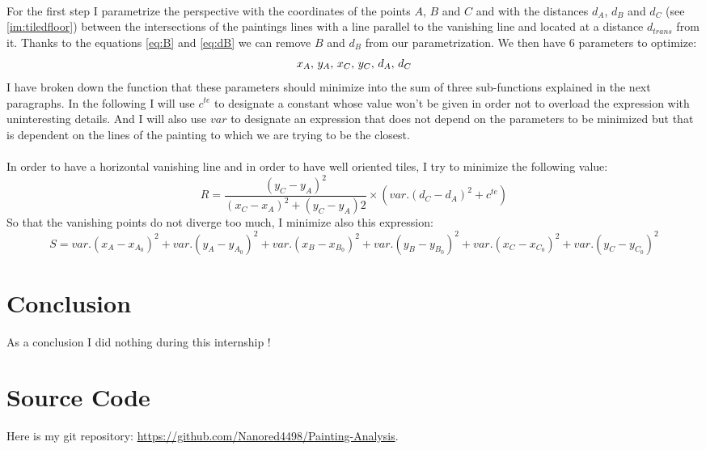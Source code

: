\documentclass[11pt]{article}
\begin{document}
	\paragraph{}
	For the first step I parametrize the perspective with the coordinates of the points $A$, $B$ and $C$ and with the distances $d_A$, $d_B$ and $d_C$ (see \figurename \ref{im:tiledfloor}) between the intersections of the paintings lines with a line parallel to the vanishing line and located at a distance $d_{trans}$ from it. Thanks to the equations \eqref{eq:B} and \eqref{eq:dB} we can remove $B$ and $d_B$ from our parametrization. We then have 6 parameters to optimize:
	\vspace{-1mm} $$ x_A, \, y_A, \, x_C, \, y_C, \, d_A, \, d_C \vspace{-1mm} $$
	I have broken down the function that these parameters should minimize into the sum of three sub-functions explained in the next paragraphs. In the following I will use $c^{te}$ to designate a constant whose value won't be given in order not to overload the expression with uninteresting details. And I will also use $var$ to designate an expression that does not depend on the parameters to be minimized but that is dependent on the lines of the painting to which we are trying to be the closest.
	
	\paragraph{}
	In order to have a horizontal vanishing line and in order to have well oriented tiles, I try to minimize the following value:
	\begin{equation}
		\label{eq:R}
		R = \dfrac{(y_C - y_A)^2}{(x_C - x_A)^2 + (y_C - y_A)2} \times \left( var . (d_C - d_A)^2 + c^{te} \right)
	\end{equation}
	So that the vanishing points do not diverge too much, I minimize also this expression:
	\begin{equation}
		\label{eq:S}
		S = var . (x_A - x_{A_0})^2 + var . (y_A - y_{A_0})^2 + var . (x_B - x_{B_0})^2 + var . (y_B - y_{B_0})^2 + var . (x_C - x_{C_0})^2 + var . (y_C - y_{C_0})^2
	\end{equation}

	\section{Conclusion}
	
	As a conclusion I did nothing during this internship !
	
	\appendix
	
	\section{Source Code}
	
	Here is my git repository: \url{https://github.com/Nanored4498/Painting-Analysis}.

	
	
	
\end{document}
